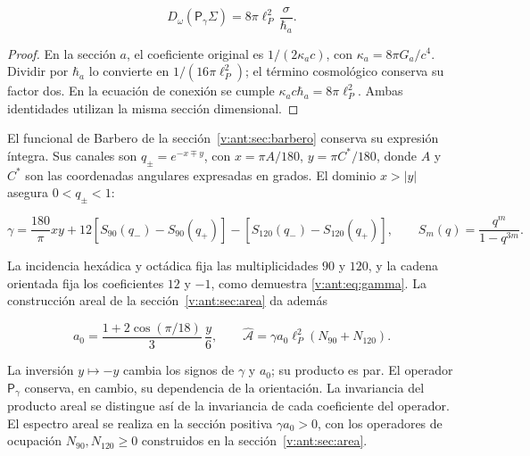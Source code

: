 \begin{equation}
D_\omega(\mathsf P_\gamma\Sigma)
=8\pi\ell_P^2\,\frac{\sigma}{\hbar_a}.
\label{nuc12:eq:4.3}
\end{equation}



\begin{proof}
En la sección \(a\), el coeficiente original es \(1/(2\kappa_a c)\), con \(\kappa_a=8\pi G_a/c^4\). Dividir por \(\hbar_a\) lo convierte en \(1/(16\pi\ell_P^2)\); el término cosmológico conserva su factor dos. En la ecuación de conexión se cumple \(\kappa_a c\hbar_a=8\pi\ell_P^2\). Ambas identidades utilizan la misma sección dimensional.
\end{proof}

El funcional de Barbero de la sección~\ref{v:ant:sec:barbero} conserva su expresión íntegra. Sus canales son \(q_\pm=e^{-x\mp y}\), con \(x=\pi A/180\), \(y=\pi C^*/180\), donde \(A\) y \(C^*\) son las coordenadas angulares expresadas en grados. El dominio \(x>|y|\) asegura \(0<q_\pm<1\):



\begin{equation}
\gamma=\frac{180}{\pi}xy+
12[S_{90}(q_-)-S_{90}(q_+)]
-[S_{120}(q_-)-S_{120}(q_+)],\qquad
S_m(q)=\frac{q^m}{1-q^{3m}}.
\label{nuc12:eq:4.4}
\end{equation}



La incidencia hexádica y octádica fija las multiplicidades \(90\) y \(120\), y la cadena orientada fija los coeficientes \(12\) y \(-1\), como demuestra \eqref{v:ant:eq:gamma}. La construcción areal de la sección~\ref{v:ant:sec:area} da además



\begin{equation}
a_0=\frac{1+2\cos(\pi/18)}3\,\frac y6,\qquad
\widehat{\mathcal A}=\gamma a_0\ell_P^2(N_{90}+N_{120}).
\label{nuc12:eq:4.5}
\end{equation}



La inversión \(y\mapsto-y\) cambia los signos de \(\gamma\) y \(a_0\); su producto es par. El operador \(\mathsf P_\gamma\) conserva, en cambio, su dependencia de la orientación. La invariancia del producto areal se distingue así de la invariancia de cada coeficiente del operador. El espectro areal se realiza en la sección positiva \(\gamma a_0>0\), con los operadores de ocupación \(N_{90},N_{120}\geq0\) construidos en la sección~\ref{v:ant:sec:area}.

